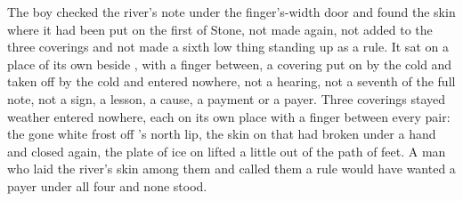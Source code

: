 The boy checked the river's note under the finger's-width door and found the skin where it had been put on the first of Stone, not made again, not added to the three coverings and not made a sixth low thing standing up as a rule. It sat on a place of its own beside , with a finger between, a covering put on by the cold and taken off by the cold and entered nowhere, not a hearing, not a seventh of the full note, not a sign, a lesson, a cause, a payment or a payer. Three coverings stayed weather entered nowhere, each on its own place with a finger between every pair: the gone white frost off 's north lip, the skin on  that had broken under a hand and closed again, the plate of ice on  lifted a little out of the path of feet. A man who laid the river's skin among them and called them a rule would have wanted a payer under all four and none stood.

